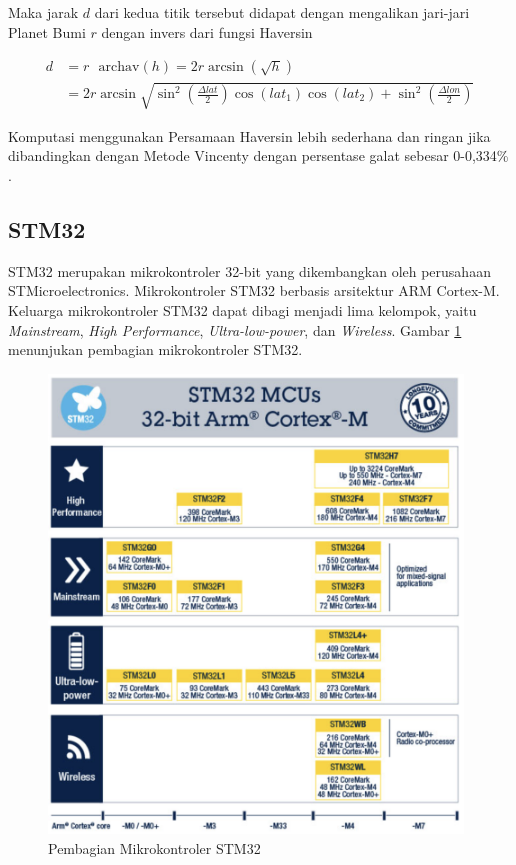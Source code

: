 Maka jarak $d$ dari kedua titik tersebut didapat dengan mengalikan jari-jari Planet Bumi $r$ dengan invers dari fungsi Haversin \cite{Omatu2013}

$$
\begin{aligned}
	d &= r \text{ }\mathrm{archav}(h) = 2r \arcsin{\left(\sqrt{h}\right)} \\
	&= 2r \arcsin{\sqrt{\sin^2{\left(\frac{\Delta lat}{2}\right)}  \cos{(lat_1)}\cos{(lat_2)} +\sin^2{\left(\frac{\Delta lon}{2}\right)}}}
\end{aligned} 
$$

Komputasi menggunakan Persamaan Haversin lebih sederhana dan ringan jika dibandingkan dengan Metode Vincenty dengan persentase galat sebesar 0-0,334\% \cite{Mahmoud2016}.

\subsection{STM32}
STM32 merupakan mikrokontroler 32-bit yang dikembangkan oleh perusahaan STMicroelectronics. Mikrokontroler STM32 berbasis arsitektur ARM Cortex-M. Keluarga mikrokontroler STM32 dapat dibagi menjadi lima kelompok, yaitu \textit{Mainstream}, \textit{High Performance}, \textit{Ultra-low-power}, dan \textit{Wireless}. Gambar \ref{Fig: stm32-groups} menunjukan pembagian mikrokontroler STM32.

\begin{figure}[H]
	\centering
	\includegraphics[width=11cm]{contents/chapter-2/stm-32-groups.png}
	\caption{Pembagian Mikrokontroler STM32 \cite{STMicroelectronics2023}}
	\label{Fig: stm32-groups}
\end{figure}

